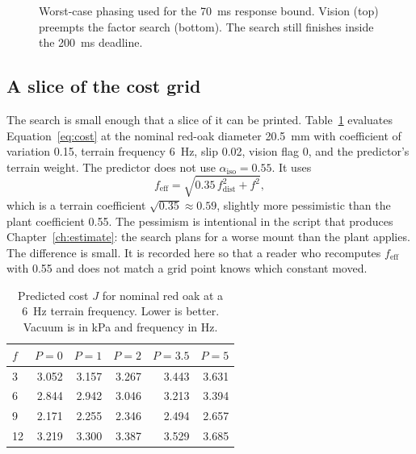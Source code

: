 \begin{figure}[htbp]
\centering
{}
\caption{Worst-case phasing used for the 70~ms response bound. Vision (top) preempts the factor search (bottom). The search still finishes inside the 200~ms deadline.}
\label{fig:schedule}
\end{figure}

\subsection{A slice of the cost grid}

The search is small enough that a slice of it can be printed. Table~\ref{tab:grid} evaluates Equation~\eqref{eq:cost} at the nominal red-oak diameter 20.5~mm with coefficient of variation 0.15, terrain frequency 6~Hz, slip 0.02, vision flag 0, and the predictor's terrain weight. The predictor does not use $\alpha_{\mathrm{iso}}=0.55$. It uses
\begin{equation}
f_{\mathrm{eff}} = \sqrt{0.35\,f_{\mathrm{dist}}^2 + f^2},
\label{eq:feffpred}
\end{equation}
which is a terrain coefficient $\sqrt{0.35}\approx 0.59$, slightly more pessimistic than the plant coefficient 0.55. The pessimism is intentional in the script that produces Chapter~\ref{ch:estimate}: the search plans for a worse mount than the plant applies. The difference is small. It is recorded here so that a reader who recomputes $f_{\mathrm{eff}}$ with 0.55 and does not match a grid point knows which constant moved.

\begin{table}[htbp]
\centering
\caption{Predicted cost $J$ for nominal red oak at a 6~Hz terrain frequency. Lower is better. Vacuum is in kPa and frequency in Hz.}
\label{tab:grid}
\begin{tabular}{@{}lrrrrr@{}}
\toprule
$f$ & $P=0$ & $P=1$ & $P=2$ & $P=3.5$ & $P=5$ \\
\midrule
3 & 3.052 & 3.157 & 3.267 & 3.443 & 3.631 \\
6 & 2.844 & 2.942 & 3.046 & 3.213 & 3.394 \\
9 & 2.171 & 2.255 & 2.346 & 2.494 & 2.657 \\
12 & 3.219 & 3.300 & 3.387 & 3.529 & 3.685 \\
\bottomrule
\end{tabular}
\end{table}

